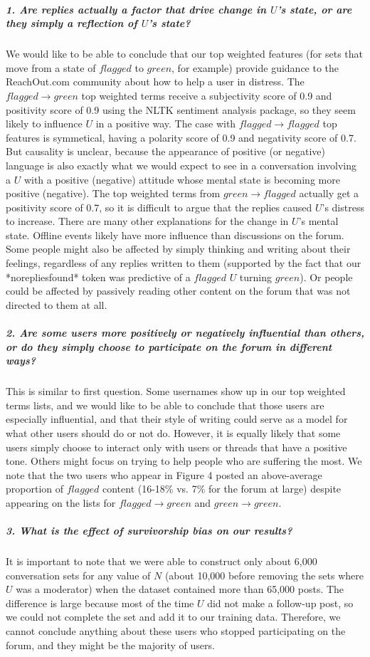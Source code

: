 \documentclass{article}
\begin{document}
\subparagraph{1. Are replies actually a factor that drive change in $U$'s state, or are they simply a reflection of $U$'s state?}We would like to be able to conclude that our top weighted features (for sets that move from a state of $flagged$ to $green$, for example) provide guidance to the ReachOut.com community about how to help a user in distress. The $flagged \rightarrow green$ top weighted terms receive a subjectivity score of 0.9 and positivity score of 0.9 using the NLTK sentiment analysis package, so they seem likely to influence $U$ in a positive way. The case with $flagged \rightarrow flagged$ top features is symmetical, having a polarity score of 0.9 and negativity score of 0.7. But causality is unclear, because the appearance of positive (or negative) language is also exactly what we would expect to see in a conversation involving a $U$ with a positive (negative) attitude whose mental state is becoming more positive (negative). The top weighted terms from $green \rightarrow flagged$ actually get a positivity score of 0.7, so it is difficult to argue that the replies caused $U$'s distress to increase. There are many other explanations for the change in $U$'s mental state. Offline events likely have more influence than discussions on the forum. Some people might also be affected by simply thinking and writing about their feelings, regardless of any replies written to them (supported by the fact that our *norepliesfound* token was predictive of a $flagged$ $U$ turning $green$). Or people could be affected by passively reading other content on the forum that was not directed to them at all.

\subparagraph{2. Are some users more positively or negatively influential than others, or do they simply choose to participate on the forum in different ways?}This is similar to first question. Some usernames show up in our top weighted terms lists, and we would like to be able to conclude that those users are especially influential, and that their style of writing could serve as a model for what other users should do or not do. However, it is equally likely that some users simply choose to interact only with users or threads that have a positive tone. Others might focus on trying to help people who are suffering the most. We note that the two users who appear in Figure 4 posted an above-average proportion of $flagged$ content (16-18\% vs. 7\% for the forum at large) despite appearing on the lists for $flagged \rightarrow green$ and $green \rightarrow green$.

\subparagraph{3. What is the effect of survivorship bias on our results?}It is important to note that we were able to construct only about 6,000 conversation sets for any value of $N$ (about 10,000 before removing the sets where $U$ was a moderator) when the dataset contained more than 65,000 posts. The difference is large because most of the time $U$ did not make a follow-up post, so we could not complete the set and add it to our training data. Therefore, we cannot conclude anything about these users who stopped participating on the forum, and they might be the majority of users.
\end{document}
